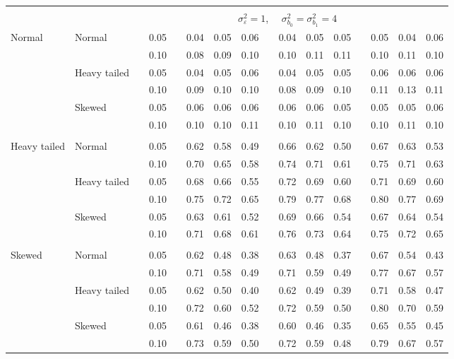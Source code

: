 \documentclass[12pt]{article} %
\begin{document}
\begin{table}[ht]
\begin{scriptsize}
\begin{center}
\begin{tabular}{ll p{.1cm} c p{.1cm} rrr p{.1cm} rrr p{.1cm} rrr}
&&&&&&&&&&&&&&&\\
& && && \multicolumn{9}{c}{$\sigma_{\varepsilon}^2 = 1$, \ \ $\sigma_{b_0}^2 = \sigma_{b_1}^2 = 4$} \\ \cline{6-16}
\rowcolor{gray!20}Normal       & Normal       && 0.05 &&   0.04 & 0.05 & 0.06 && 0.04 & 0.05 & 0.05 &&   0.05 & 0.04 & 0.06 \\
\rowcolor{gray!20}             &              && 0.10 &&   0.08 & 0.09 & 0.10 && 0.10 & 0.11 & 0.11 &&   0.10 & 0.11 & 0.10 \\
\rowcolor{gray!20}             & Heavy tailed && 0.05 &&   0.04 & 0.05 & 0.06 && 0.04 & 0.05 & 0.05 &&   0.06 & 0.06 & 0.06 \\
\rowcolor{gray!20}             &              && 0.10 &&   0.09 & 0.10 & 0.10 && 0.08 & 0.09 & 0.10 &&   0.11 & 0.13 & 0.11 \\
\rowcolor{gray!20}             & Skewed       && 0.05 &&   0.06 & 0.06 & 0.06 && 0.06 & 0.06 & 0.05 &&   0.05 & 0.05 & 0.06 \\
\rowcolor{gray!20}             &              && 0.10 &&   0.10 & 0.10 & 0.11 && 0.10 & 0.11 & 0.10 &&   0.10 & 0.11 & 0.10 \\
             &&&&&&&&&&&&&&&\\
Heavy tailed & Normal       && 0.05 &&   0.62 & 0.58 & 0.49 && 0.66 & 0.62 & 0.50 && 0.67 & 0.63 & 0.53 \\  
             &              && 0.10 &&   0.70 & 0.65 & 0.58 && 0.74 & 0.71 & 0.61 && 0.75 & 0.71 & 0.63 \\  
             & Heavy tailed && 0.05 &&   0.68 & 0.66 & 0.55 && 0.72 & 0.69 & 0.60 && 0.71 & 0.69 & 0.60 \\  
             &              && 0.10 &&   0.75 & 0.72 & 0.65 && 0.79 & 0.77 & 0.68 && 0.80 & 0.77 & 0.69 \\  
             & Skewed       && 0.05 &&   0.63 & 0.61 & 0.52 && 0.69 & 0.66 & 0.54 && 0.67 & 0.64 & 0.54 \\  
             &              && 0.10 &&   0.71 & 0.68 & 0.61 && 0.76 & 0.73 & 0.64 && 0.75 & 0.72 & 0.65 \\  
             &&&&&&&&&&&&&&&\\
Skewed       & Normal       && 0.05 &&   0.62 & 0.48 & 0.38 && 0.63 & 0.48 & 0.37 && 0.67 & 0.54 & 0.43 \\ 
             &              && 0.10 &&   0.71 & 0.58 & 0.49 && 0.71 & 0.59 & 0.49 && 0.77 & 0.67 & 0.57 \\ 
             & Heavy tailed && 0.05 &&   0.62 & 0.50 & 0.40 && 0.62 & 0.49 & 0.39 && 0.71 & 0.58 & 0.47 \\ 
             &              && 0.10 &&   0.72 & 0.60 & 0.52 && 0.72 & 0.59 & 0.50 && 0.80 & 0.70 & 0.59 \\ 
             & Skewed       && 0.05 &&   0.61 & 0.46 & 0.38 && 0.60 & 0.46 & 0.35 && 0.65 & 0.55 & 0.45 \\ 
             &              && 0.10 &&   0.73 & 0.59 & 0.50 && 0.72 & 0.59 & 0.48 && 0.79 & 0.67 & 0.57 \\ 



\end{tabular}
\end{center}
\end{scriptsize}
\end{table}
\end{document}
